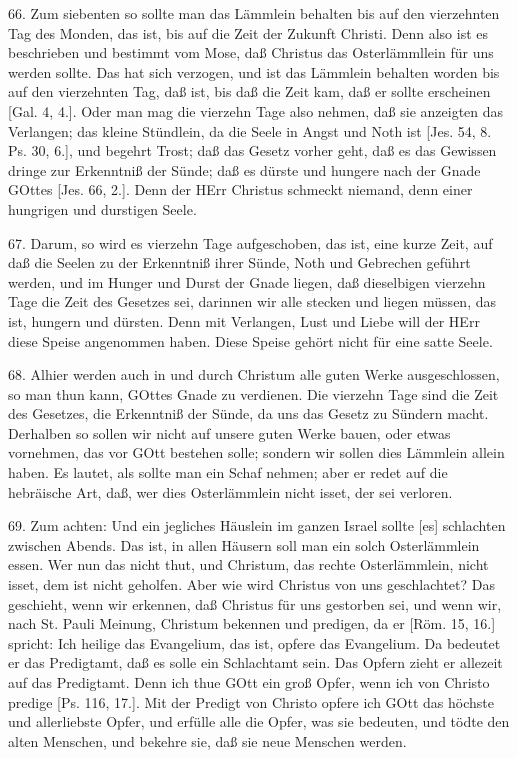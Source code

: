 66. Zum siebenten so sollte man das Lämmlein behalten bis auf den vierzehnten Tag des Monden, das ist, bis auf die Zeit der Zukunft Christi. Denn also ist es beschrieben und bestimmt vom Mose, daß Christus das Osterlämmllein
für uns werden sollte. Das hat sich verzogen, und ist das Lämmlein behalten worden bis auf den vierzehnten Tag, daß ist, bis daß die Zeit kam, daß er sollte erscheinen [Gal. 4, 4.]. Oder man mag die vierzehn Tage also nehmen, daß sie anzeigten das Verlangen; das kleine Stündlein, da die Seele in Angst und Noth ist [Jes. 54, 8. Ps. 30, 6.], und begehrt Trost; daß das Gesetz vorher geht, daß es das Gewissen dringe zur Erkenntniß der Sünde; daß es dürste und hungere nach der Gnade GOttes [Jes. 66, 2.]. Denn der HErr Christus schmeckt niemand, denn einer hungrigen und durstigen Seele.

67. Darum, so wird es vierzehn Tage aufgeschoben, das ist, eine kurze Zeit, auf daß die Seelen zu der Erkenntniß ihrer Sünde, Noth und Gebrechen geführt werden, und im Hunger und Durst der Gnade liegen, daß dieselbigen vierzehn Tage die Zeit des Gesetzes sei, darinnen wir alle stecken und liegen müssen, das ist, hungern und dürsten. Denn mit Verlangen, Lust und Liebe will der HErr diese Speise angenommen haben. Diese Speise gehört nicht für eine satte Seele.

68. Alhier werden auch in und durch Christum alle guten Werke ausgeschlossen, so man thun kann, GOttes Gnade zu verdienen. Die vierzehn Tage sind die Zeit des Gesetzes, die Erkenntniß der Sünde, da uns das Gesetz zu Sündern macht. Derhalben so sollen wir nicht auf unsere guten Werke bauen, oder etwas vornehmen, das vor GOtt bestehen solle; sondern wir sollen dies Lämmlein allein haben. Es lautet, als sollte man ein Schaf nehmen; aber er redet auf die hebräische Art, daß, wer dies Osterlämmlein nicht isset, der sei verloren.

69. Zum achten: Und ein jegliches Häuslein im ganzen Israel sollte [es] schlachten zwischen Abends. Das ist, in allen Häusern soll man ein solch Osterlämmlein essen. Wer nun das nicht thut, und Christum, das rechte Osterlämmlein, nicht isset, dem ist nicht geholfen. Aber wie wird Christus von uns geschlachtet? Das geschieht, wenn wir erkennen, daß Christus für uns gestorben sei, und wenn wir, nach St. Pauli Meinung, Christum bekennen und predigen, da er [Röm. 15, 16.] spricht: Ich heilige das Evangelium, das ist, opfere das Evangelium. Da bedeutet er das Predigtamt, daß es solle ein Schlachtamt sein. Das Opfern zieht er allezeit auf das Predigtamt. Denn ich thue GOtt ein groß Opfer, wenn ich von Christo predige [Ps. 116, 17.]. Mit der Predigt von Christo opfere ich GOtt das höchste und allerliebste Opfer, und erfülle alle die Opfer, was sie bedeuten, und tödte den alten Menschen, und bekehre sie, daß sie neue Menschen werden.

